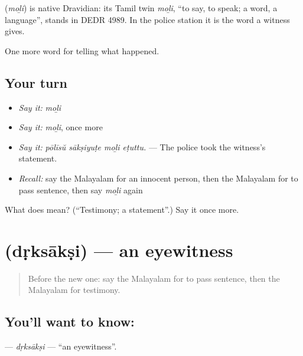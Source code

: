 \begin{cousinweb}
\textbf{} (\emph{moḻi}) is native Dravidian: its Tamil twin \emph{moḻi}, \textquotedblleft{}to say, to speak; a word, a language\textquotedblright{}, stands in DEDR 4989. In the police station it is the word a witness gives.
\end{cousinweb}

\begin{grammarlens}[title={What you've built}]
One more word for telling what happened.
\end{grammarlens}

\subsection*{Your turn}
\begin{itemize}
\raggedright
  \item \emph{Say it:} \emph{moḻi}
  \item \emph{Say it:} \emph{moḻi}, once more
  \item \emph{Say it:} \emph{pōlīsŭ sākṣiyuṭe moḻi eṭuttu.} — The police took the witness's statement.
  \item \emph{Recall:} say the Malayalam for an innocent person, then the Malayalam for to pass sentence, then say \emph{moḻi} again
\end{itemize}

\begin{tcolorbox}[breakable,colback=teal!4,colframe=teal!35!black,title={Before you move on}]
What does  mean? (\textquotedblleft{}Testimony; a statement\textquotedblright{}.) Say it once more.
\end{tcolorbox}
\section[\texorpdfstring{\ml{ദൃക്സാക്ഷി} (dṛksākṣi)}{ദൃക്സാക്ഷി (dṛksākṣi)}]{ (dṛksākṣi) — an eyewitness}

\label{lesson:ML-C370-drksaksi}



\begin{quote}
Before the new one: say the Malayalam for to pass sentence, then the Malayalam for testimony.
\end{quote}

\subsection*{You'll want to know: }
\textbf{} — \emph{dṛksākṣi} — \textquotedblleft{}an eyewitness\textquotedblright{}.

